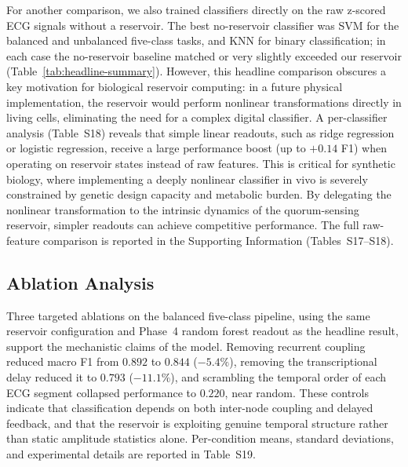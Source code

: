 \documentclass[journal=asbcd6,manuscript=article,keywords]{achemso}
\begin{document}
For another comparison, we also trained classifiers directly on the raw z-scored ECG signals without a reservoir.
The best no-reservoir classifier was SVM for the balanced and unbalanced five-class tasks, and KNN for binary classification; in each case the no-reservoir baseline matched or very slightly exceeded our reservoir (Table~\ref{tab:headline-summary}).
However, this headline comparison obscures a key motivation for biological reservoir computing: in a future physical implementation, the reservoir would perform nonlinear transformations directly in living cells, eliminating the need for a complex digital classifier. 
A per-classifier analysis (Table~S18) reveals that simple linear readouts, such as ridge regression or logistic regression, receive a large performance boost (up to $+0.14$ F1) when operating on reservoir states instead of raw features. 
This is critical for synthetic biology, where implementing a deeply nonlinear classifier in vivo is severely constrained by genetic design capacity and metabolic burden. 
By delegating the nonlinear transformation to the intrinsic dynamics of the quorum-sensing reservoir, simpler readouts can achieve competitive performance. 
The full raw-feature comparison is reported in the Supporting Information (Tables~S17--S18).

\subsection{Ablation Analysis}
\label{sec:ablation}

Three targeted ablations on the balanced five-class pipeline, using the same reservoir configuration and Phase~4 random forest readout as the headline result, support the mechanistic claims of the model. 
Removing recurrent coupling reduced macro F1 from $0.892$ to $0.844$ ($-5.4\%$), removing the transcriptional delay reduced it to $0.793$ ($-11.1\%$), and scrambling the temporal order of each ECG segment collapsed performance to $0.220$, near random. 
These controls indicate that classification depends on both inter-node coupling and delayed feedback, and that the reservoir is exploiting genuine temporal structure rather than static amplitude statistics alone. 
Per-condition means, standard deviations, and experimental details are reported in Table~S19.
\end{document}
